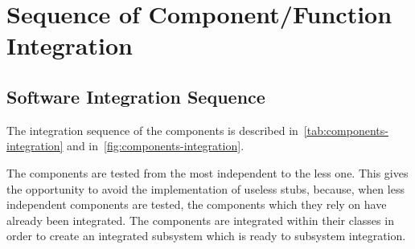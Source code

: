 \section{Sequence of Component/Function Integration}
\label{sec:sequence-integration}

\subsection{Software Integration Sequence}
The integration sequence of the components is described in~\autoref{tab:components-integration} and in~\autoref{fig:components-integration}.

The components are tested from the most independent to the less one. This gives the opportunity to avoid the implementation of useless stubs, because, when less independent components are tested, the components which they rely on have already been integrated.
The components are integrated within their classes in order to create an integrated subsystem which is ready to subsystem integration.

